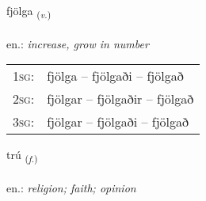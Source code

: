 \documentclass[frontgrid, backgrid]{flacards}\usepackage[]{graphicx}\usepackage[]{xcolor}
\begin{document}
\renewcommand{\flhead}{\vskip5pt \fboxsep=0pt {\small\bfseries\footnotesize Sagnorð | Verb}}
\renewcommand{\fcfoot}{\vskip5pt \fboxsep=0pt \hspace{2pt}{\small\bfseries\footnotesize 1K}}

\renewcommand{\blhead}{\vskip5pt {\small\bfseries\footnotesize Sagnorð | Verb }}
\renewcommand{\bcfoot}{\vskip5pt \hspace{2pt}{\small\bfseries\footnotesize 1K}}


{fjölga \small{\textsubscript{(\textit{v.})}} \\[1ex] %
\textphonetic{[fjœlka]} \\
en.: \emph{increase, grow in number} \\  [2ex]
\renewcommand*{\arraystretch}{0.8}
\begin{tabular}{p{1cm}l}
\textsc{1sg}: & fjölga -- fjölgaði -- fjölgað \\ 
\textsc{2sg}: & fjölgar -- fjölgaðir -- fjölgað \\ 
\textsc{3sg}: & fjölgar -- fjölgaði -- fjölgað \\ 
\end{tabular}
}

\renewcommand{\flhead}{\vskip5pt \fboxsep=0pt {\small\bfseries\footnotesize Nafnorð | Noun}}
\renewcommand{\fcfoot}{\vskip5pt \fboxsep=0pt \hspace{2pt}{\small\bfseries\footnotesize 1K}}

\renewcommand{\blhead}{\vskip5pt {\small\bfseries\footnotesize Nafnorð | Noun }}
\renewcommand{\bcfoot}{\vskip5pt \hspace{2pt}{\small\bfseries\footnotesize 1K}}


{trú \small{\textsubscript{(\textit{f.})}} \\[1ex] %
\textphonetic{[tʰruː]} \\
en.: \emph{religion; faith; opinion} \\  [2ex]
\renewcommand*{\arraystretch}{0.8}
}
\end{document}

